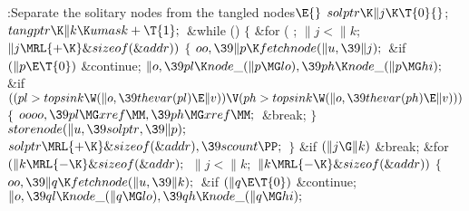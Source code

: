 \Y\B\4:Separate the solitary nodes from the tangled nodes\X${}\E{}$\6
$\\{solptr}\K\|j\K\T{0}{}$;\5
${}\\{tangptr}\K\|k\K\\{umask}+\T{1};{}$\6
\&{while} ()\5
${}\{{}$\1\6
\&{for} ( ; ${}\|j<\|k;{}$ ${}\|j\MRL{+{\K}}\&{sizeof}(\&{addr})){}$\5
${}\{{}$\1\6
${}\\{oo},\39\|p\K\\{fetchnode}(\|u,\39\|j);{}$\6
\&{if} ${}(\|p\E\T{0}){}$\1\5
\&{continue};\2\6
${}\|o,\39\\{pl}\K\\{node\_}(\|p\MG\\{lo}),\39\\{ph}\K\\{node\_}(\|p\MG%
\\{hi});{}$\6
\&{if} ${}((\\{pl}>\\{topsink}\W(\|o,\39\\{thevar}(\\{pl})\E\|v))\V(\\{ph}>%
\\{topsink}\W(\|o,\39\\{thevar}(\\{ph})\E\|v))){}$\5
${}\{{}$\1\6
${}\\{oooo},\39\\{pl}\MG\\{xref}\MM,\39\\{ph}\MG\\{xref}\MM;{}$\6
\&{break};\6
\4${}\}{}$\2\6
${}\\{storenode}(\|u,\39\\{solptr},\39\|p);{}$\6
${}\\{solptr}\MRL{+{\K}}\&{sizeof}(\&{addr}),\39\\{scount}\PP;{}$\6
\4${}\}{}$\2\6
\&{if} ${}(\|j\G\|k){}$\1\5
\&{break};\2\6
\&{for} ${}(\|k\MRL{-{\K}}\&{sizeof}(\&{addr});{}$ ${}\|j<\|k;{}$ ${}\|k\MRL{-{%
\K}}\&{sizeof}(\&{addr})){}$\5
${}\{{}$\1\6
${}\\{oo},\39\|q\K\\{fetchnode}(\|u,\39\|k);{}$\6
\&{if} ${}(\|q\E\T{0}){}$\1\5
\&{continue};\2\6
${}\|o,\39\\{ql}\K\\{node\_}(\|q\MG\\{lo}),\39\\{qh}\K\\{node\_}(\|q\MG%
\\{hi});{}$\6

